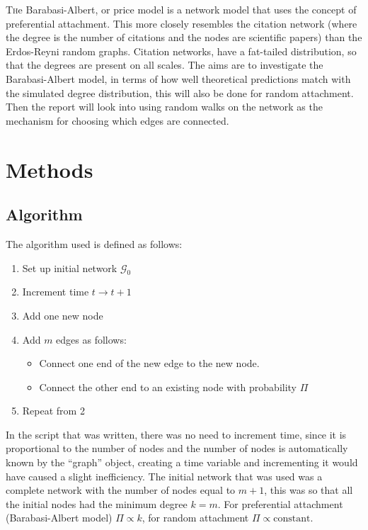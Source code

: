 \documentclass[twoside]{article}
\begin{document}
\lettrine[nindent=0em,lines=2]{T}he Barabasi-Albert, or price model is a network model that uses the concept of preferential attachment. This more closely resembles the citation network (where the degree is the number of citations and the nodes are scientific papers) than the Erdos-Reyni random graphs. Citation networks, have a fat-tailed distribution, so that the degrees are present on all scales. The aims are to investigate the Barabasi-Albert model, in terms of how well theoretical predictions match with the simulated degree distribution, this will also be done for random attachment. Then the report will look into using random walks on the network as the mechanism for choosing which edges are connected.


\section{Methods}
\subsection{Algorithm}
The algorithm used is defined as follows:\cite{script}
\begin{enumerate}
\item Set up initial network $\mathcal{G}_0$ 
\item Increment time $t \to t +1 $
\item Add one new node
\item Add $m$ edges as follows:
\begin{itemize}
\item Connect one end of the new edge to the new node.
\item Connect the other end to an existing node with probability $\Pi$
\end{itemize}
\item Repeat from 2
\end{enumerate}
In the script that was written, there was no need to increment time, since it is proportional to the number of nodes and the number of nodes is automatically known by the ``graph'' object, creating a time variable and incrementing it would have caused a slight inefficiency. The initial network that was used was a complete network with the number of nodes equal to $m+1$, this was so that all the initial nodes had the minimum degree $k=m$. For preferential attachment (Barabasi-Albert model) $\Pi \propto k$, for random attachment $\Pi \propto \text{constant}$.
\end{document}
